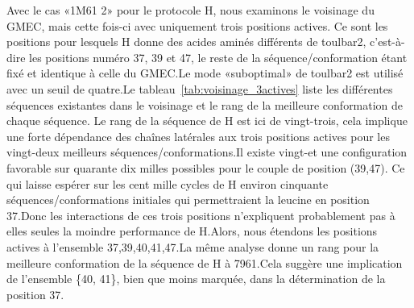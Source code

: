 Avec le cas «1M61 2» pour le protocole H, nous examinons le voisinage du GMEC, mais cette fois-ci avec uniquement trois positions actives. Ce sont les positions pour lesquels H donne des acides aminés différents de toulbar2, c'est-à-dire les positions numéro 37, 39 et 47, le reste de la séquence/conformation étant fixé et identique à celle du GMEC.Le mode «suboptimal» de toulbar2 est utilisé avec un seuil de quatre.Le tableau~\ref{tab:voisinage_3actives} liste les différentes séquences existantes dans le voisinage et le rang de la meilleure conformation de chaque séquence. Le rang de la séquence de H est ici de vingt-trois, cela implique une forte dépendance des chaînes latérales aux trois positions actives pour les vingt-deux meilleurs séquences/conformations.Il existe vingt-et une configuration favorable sur quarante dix milles possibles pour le couple de position (39,47). Ce qui laisse espérer sur les cent mille cycles de H environ cinquante séquences/conformations initiales qui permettraient la leucine en position 37.Donc les interactions de ces trois positions n'expliquent probablement pas à elles seules la moindre performance de H.Alors, nous étendons les positions actives à l'ensemble {37,39,40,41,47}.La même analyse donne un rang pour la meilleure conformation de la séquence de H à 7961.Cela suggère une implication de l'ensemble \{40, 41\}, bien que moins marquée, dans la détermination de la position 37.


